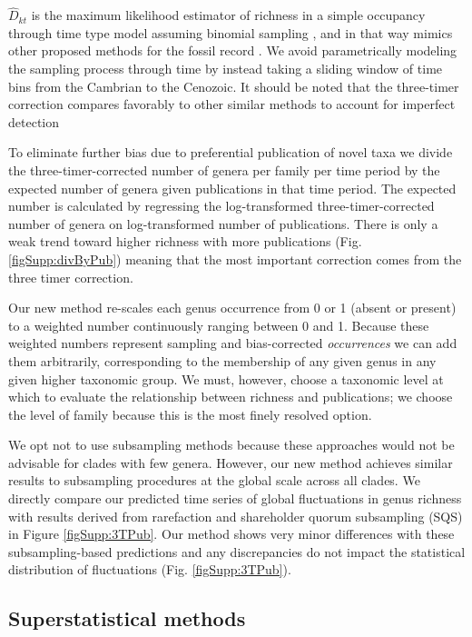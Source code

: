 \documentclass[12pt]{article}
\let\citep=\cite
\begin{document}
$\hat{D}_{kt}$ is the maximum likelihood estimator of richness in a
simple occupancy through time type model assuming binomial sampling
\citep{royleDorazio}, and in that way mimics other proposed methods
for the fossil record \citep{foote2016, starrfelt2016}. We avoid
parametrically modeling the sampling process through time by instead
taking a sliding window of time bins from the Cambrian to the
Cenozoic. It should be noted that the three-timer correction compares
favorably to other similar methods to account for imperfect detection
\citep{alroy2014}

To eliminate further bias due to preferential publication of novel
taxa \citep{alroy2010} we divide the three-timer-corrected number of
genera per family per time period by the expected number of genera
given publications in that time period.  The expected number is
calculated by regressing the log-transformed three-timer-corrected
number of genera on log-transformed number of publications. There is
only a weak trend toward higher richness with more publications
(Fig. \ref{figSupp:divByPub}) meaning that the most important correction
comes from the three timer correction.

Our new method re-scales each genus occurrence from 0 or 1 (absent or
present) to a weighted number continuously ranging between 0 and
1. Because these weighted numbers represent sampling and
bias-corrected {\it occurrences} we can add them arbitrarily,
corresponding to the membership of any given genus in any given higher
taxonomic group.  We must, however, choose a taxonomic level at which
to evaluate the relationship between richness and publications; we
choose the level of family because this is the most finely resolved
option.

We opt not to use subsampling methods \citep{miller1996, alroy2010,
  kocsis2018} because these approaches would not be advisable for
clades with few genera. However, our new method achieves similar
results to subsampling procedures at the global scale across all
clades. We directly compare our predicted time series of global
fluctuations in genus richness with results derived from rarefaction
and shareholder quorum subsampling (SQS) in Figure
\ref{figSupp:3TPub}.  Our method shows very minor differences with
these subsampling-based predictions and any discrepancies do not
impact the statistical distribution of fluctuations
(Fig. \ref{figSupp:3TPub}).


\subsection{Superstatistical methods} \label{sec:numMeth}
\end{document}
